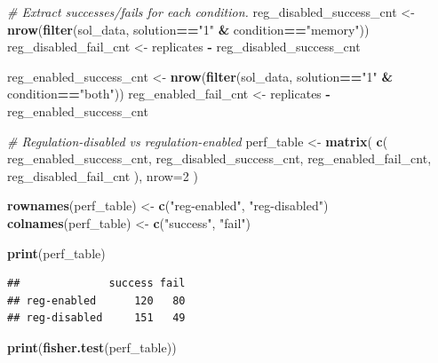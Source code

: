 \documentclass[]{book}
\newenvironment{Shaded}{\begin{snugshade}}{\end{snugshade}}
\newcommand{\CommentTok}[1]{\textcolor[rgb]{0.56,0.35,0.01}{\textit{#1}}}
\newcommand{\DataTypeTok}[1]{\textcolor[rgb]{0.13,0.29,0.53}{#1}}
\newcommand{\DecValTok}[1]{\textcolor[rgb]{0.00,0.00,0.81}{#1}}
\newcommand{\KeywordTok}[1]{\textcolor[rgb]{0.13,0.29,0.53}{\textbf{#1}}}
\newcommand{\NormalTok}[1]{#1}
\newcommand{\OperatorTok}[1]{\textcolor[rgb]{0.81,0.36,0.00}{\textbf{#1}}}
\newcommand{\StringTok}[1]{\textcolor[rgb]{0.31,0.60,0.02}{#1}}
\begin{document}
\begin{Shaded}
\begin{Highlighting}[]
\CommentTok{# Extract successes/fails for each condition.}
\NormalTok{reg_disabled_success_cnt <-}\StringTok{ }\KeywordTok{nrow}\NormalTok{(}\KeywordTok{filter}\NormalTok{(sol_data, solution}\OperatorTok{==}\StringTok{"1"} \OperatorTok{&}\StringTok{ }\NormalTok{condition}\OperatorTok{==}\StringTok{"memory"}\NormalTok{))}
\NormalTok{reg_disabled_fail_cnt <-}\StringTok{ }\NormalTok{replicates }\OperatorTok{-}\StringTok{ }\NormalTok{reg_disabled_success_cnt}

\NormalTok{reg_enabled_success_cnt <-}\StringTok{ }\KeywordTok{nrow}\NormalTok{(}\KeywordTok{filter}\NormalTok{(sol_data, solution}\OperatorTok{==}\StringTok{"1"} \OperatorTok{&}\StringTok{ }\NormalTok{condition}\OperatorTok{==}\StringTok{"both"}\NormalTok{))}
\NormalTok{reg_enabled_fail_cnt <-}\StringTok{ }\NormalTok{replicates }\OperatorTok{-}\StringTok{ }\NormalTok{reg_enabled_success_cnt}

\CommentTok{# Regulation-disabled vs regulation-enabled}
\NormalTok{perf_table <-}\StringTok{ }\KeywordTok{matrix}\NormalTok{(}
  \KeywordTok{c}\NormalTok{(}
\NormalTok{    reg_enabled_success_cnt,}
\NormalTok{    reg_disabled_success_cnt,}
\NormalTok{    reg_enabled_fail_cnt,}
\NormalTok{    reg_disabled_fail_cnt}
\NormalTok{    ),}
    \DataTypeTok{nrow=}\DecValTok{2}
\NormalTok{)}

\KeywordTok{rownames}\NormalTok{(perf_table) <-}\StringTok{ }\KeywordTok{c}\NormalTok{(}\StringTok{"reg-enabled"}\NormalTok{, }\StringTok{"reg-disabled"}\NormalTok{)}
\KeywordTok{colnames}\NormalTok{(perf_table) <-}\StringTok{ }\KeywordTok{c}\NormalTok{(}\StringTok{"success"}\NormalTok{, }\StringTok{"fail"}\NormalTok{)}

\KeywordTok{print}\NormalTok{(perf_table)}
\end{Highlighting}
\end{Shaded}

\begin{verbatim}
##              success fail
## reg-enabled      120   80
## reg-disabled     151   49
\end{verbatim}

\begin{Shaded}
\begin{Highlighting}[]
\KeywordTok{print}\NormalTok{(}\KeywordTok{fisher.test}\NormalTok{(perf_table))}
\end{Highlighting}
\end{Shaded}
\end{document}

